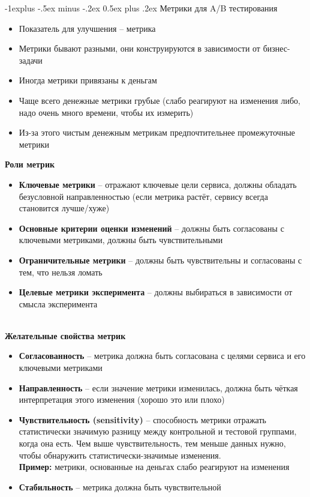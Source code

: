 \documentclass[10pt,landscape]{article}
\makeatletter
\renewcommand{\subsection}{\@startsection{subsection}{2}{0mm}%
                                {-1explus -.5ex minus -.2ex}%
                                {0.5ex plus .2ex}%
                                {\normalfont\normalsize\bfseries}}
\makeatother
\begin{document}
\begin{multicols}{3}
\subsection{Метрики для A/B тестирования}
\begin{itemize}
    \item Показатель для улучшения – метрика
\item Метрики бывают разными, они конструируются
в зависимости от бизнес-задачи
\item Иногда метрики привязаны к деньгам
\item Чаще всего денежные метрики грубые (слабо
реагируют на изменения либо, надо очень много
времени, чтобы их измерить)
\item Из-за этого чистым денежным метрикам предпочтительнее
промежуточные метрики
\end{itemize}
\textbf{Роли метрик}
\begin{itemize}
    \item \textbf{Ключевые метрики} – отражают ключевые цели сервиса,
должны обладать безусловной направленностью (если
метрика растёт, сервису всегда становится лучше/хуже)
\item \textbf{Основные критерии оценки изменений} – должны
быть согласованы с ключевыми метриками, должны быть
чувствительными
\item \textbf{Ограничительные метрики} – должны быть чувствительны и
согласованы с тем, что нельзя ломать
\item \textbf{Целевые метрики эксперимента} – должны выбираться
в зависимости от смысла эксперимента
\end{itemize}
$\text{    }\;\;$\\
\textbf{Желательные свойства метрик}
\begin{itemize}
    \item \textbf{Согласованность} – метрика должна быть согласована
с целями сервиса и его ключевыми метриками
\item \textbf{Направленность} – если значение метрики изменилась,
должна быть чёткая интерпретация этого изменения
(хорошо это или плохо)
\item \textbf{Чувствительность (sensitivity) }– способность метрики
отражать статистически значимую разницу между
контрольной и тестовой группами, когда она есть. Чем выше чувствительность, тем меньше данных нужно,
чтобы обнаружить статистически-значимые изменения.\\
\textbf{Пример:} метрики, основанные на деньгах слабо
реагируют на изменения
\item \textbf{Стабильность} – метрика должна быть чувствительной

\end{itemize}
\end{multicols}
\end{document}
